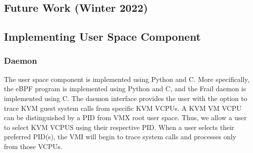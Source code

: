 \documentclass{report}
\begin{document}
\begin{spacing}{1.5}








\chapter{Future Work (Winter 2022)}



\section{Implementing User Space Component}


\subsection{Daemon}

{\large
The user space component is implemented using Python and C. More specifically, the eBPF program is implemented using Python and C, and the Frail daemon is implemented using C. The daemon interface provides the user with the option to trace KVM guest system calls from specific KVM VCPUs. A KVM VM VCPU can be distinguished by a PID from VMX root user space. Thus, we allow a user to select KVM VCPUS using their respective PID. When a user selects their preferred PID(s), the VMI will begin to trace system calls and processes only from those VCPUs. 
\newline
}


\end{spacing}
\end{document}
